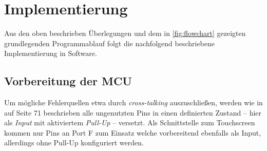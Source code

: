 \chapter{Implementierung}
	Aus den oben beschrieben Überlegungen und dem in \cref{fig:flowchart} gezeigten grundlegenden Programmablauf folgt die nachfolgend beschriebene Implementierung in Software.



	\section{Vorbereitung der MCU}
		Um mögliche Fehlerquellen etwa durch \textit{cross-talking} auszuschließen, werden wie in \cite{MicrochipTechnologyInc.ATmega32U4.Datasheet.2016} auf Seite 71 beschrieben alle ungenutzten Pins in einen definierten Zustand -- hier als \textit{Input} mit aktiviertem \textit{Pull-Up} -- versetzt.
		Als Schnittstelle zum Touchscreen kommen nur Pins an Port F zum Einsatz welche vorbereitend ebenfalls als Input, allerdings ohne Pull-Up konfiguriert werden.\par

